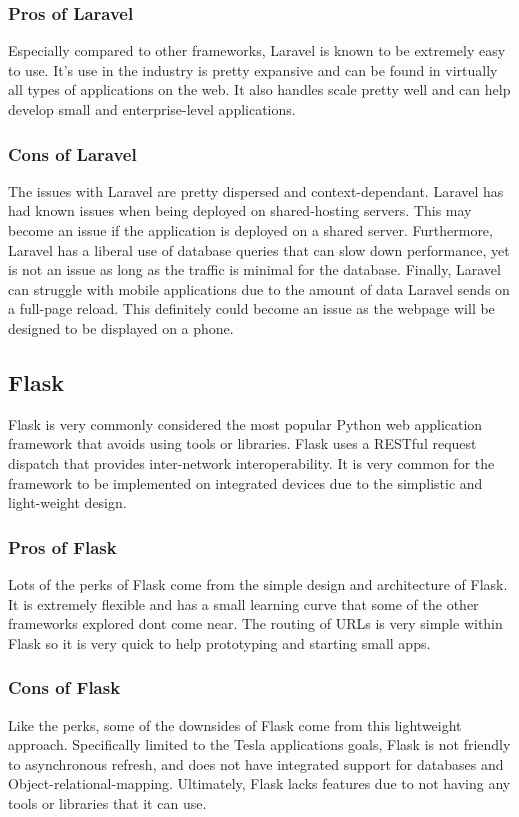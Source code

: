 \documentclass[onecolumn, draftclsnofoot,10pt, compsoc]{IEEEtran}
\begin{document}
\subsubsection{Pros of Laravel}
Especially compared to other frameworks, Laravel is known to be extremely easy to use. It’s use in the industry is pretty expansive and can be found in virtually all types of applications on the web. It also handles scale pretty well and can help develop small and enterprise-level applications.

\subsubsection{Cons of Laravel}
The issues with Laravel are pretty dispersed and context-dependant. Laravel has had known issues when being deployed on shared-hosting servers. This may become an issue if the application is deployed on a shared server. Furthermore, Laravel has a liberal use of database queries that can slow down performance, yet is not an issue as long as the traffic is minimal for the database. Finally, Laravel can struggle with mobile applications due to the amount of data Laravel sends on a full-page reload\cite{campbell_2017}. This definitely could become an issue as the webpage will be designed to be displayed on a phone.

\subsection{Flask}
Flask is very commonly considered the most popular Python web application framework that avoids using tools or libraries. Flask uses a RESTful request dispatch that provides inter-network interoperability. It is very common for the framework to be implemented on integrated devices due to the simplistic and light-weight design. \cite{malhotra_2018}

\subsubsection{Pros of Flask}
Lots of the perks of Flask come from the simple design and architecture of Flask. It is extremely flexible and has a small learning curve that some of the other frameworks explored don\textquotesingle t come near. The routing of URLs is very simple within Flask so it is very quick to help prototyping and starting small apps.

\subsubsection{Cons of Flask}
Like the perks, some of the downsides of Flask come from this lightweight approach. Specifically limited to the Tesla application\textquotesingle s goals, Flask is not friendly to asynchronous refresh, and does not have integrated support for databases and Object-relational-mapping. Ultimately, Flask lacks features due to not having any tools or libraries that it can use. \cite{dojo_2016}
\end{document}
